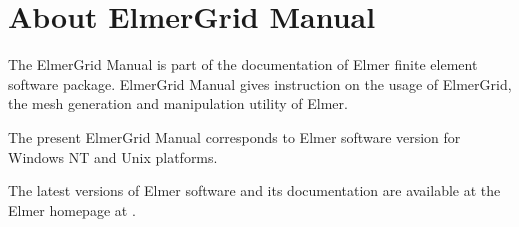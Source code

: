 \chapter*{About ElmerGrid Manual}

The ElmerGrid Manual is part of the documentation of 
Elmer finite element software package.
ElmerGrid Manual gives instruction 
on the usage of ElmerGrid, the mesh generation and manipulation utility of Elmer.

The present ElmerGrid Manual
corresponds to Elmer software version \elmerversion{} for 
Windows NT and Unix platforms. 

The latest versions of Elmer software and its documentation
are available at the Elmer homepage at
. 



